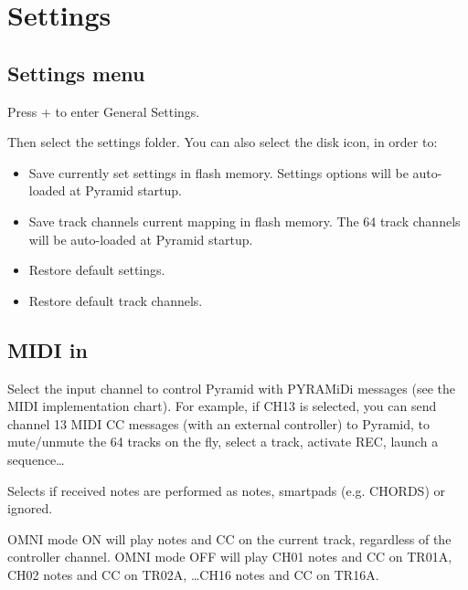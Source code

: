 \chapter{Settings}

\section{Settings menu}

Press  +  to enter General Settings.


Then select the settings folder. You can also select the disk icon, in order to:

\begin{itemize}
\item Save currently set settings in flash memory. Settings options will be auto-loaded at Pyramid startup.
\item Save track channels current mapping in flash memory. The 64 track channels will be auto-loaded at Pyramid startup.
\item Restore default settings.
\item Restore default track channels.
\end{itemize}



\section{MIDI in}

  \settingopt{\ldots}  

Select the input channel to control Pyramid with PYRAMiDi messages (see the MIDI implementation chart). For example, if CH13 is selected, you can send channel 13 MIDI CC messages (with an external controller) to Pyramid, to mute/unmute the 64 tracks on the fly, select a track, activate REC, launch a sequence\ldots

   

Selects if received notes are performed as notes, smartpads (e.g. CHORDS) or ignored.

  

OMNI mode ON will play notes and CC on the current track, regardless of the controller channel. OMNI mode OFF will play CH01 notes and CC on TR01A, CH02 notes and CC on TR02A, \ldots CH16 notes and CC on TR16A.

